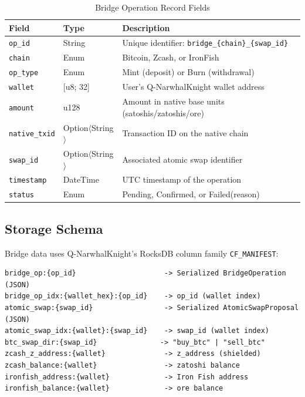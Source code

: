 \documentclass[11pt,a4paper]{article}
\begin{document}
\begin{table}[H]
\centering
\caption{Bridge Operation Record Fields}
\begin{tabularx}{\textwidth}{l l X}
\toprule
\textbf{Field} & \textbf{Type} & \textbf{Description} \\
\midrule
\texttt{op\_id} & String & Unique identifier: \texttt{bridge\_\{chain\}\_\{swap\_id\}} \\
\texttt{chain} & Enum & Bitcoin, Zcash, or IronFish \\
\texttt{op\_type} & Enum & Mint (deposit) or Burn (withdrawal) \\
\texttt{wallet} & {[}u8; 32{]} & User's Q-NarwhalKnight wallet address \\
\texttt{amount} & u128 & Amount in native base units (satoshis/zatoshis/ore) \\
\texttt{native\_txid} & Option$\langle$String$\rangle$ & Transaction ID on the native chain \\
\texttt{swap\_id} & Option$\langle$String$\rangle$ & Associated atomic swap identifier \\
\texttt{timestamp} & DateTime & UTC timestamp of the operation \\
\texttt{status} & Enum & Pending, Confirmed, or Failed(reason) \\
\bottomrule
\end{tabularx}
\end{table}

\subsection{Storage Schema}

Bridge data uses Q-NarwhalKnight's RocksDB column family \texttt{CF\_MANIFEST}:

\begin{lstlisting}[language={},title={Storage Key Format}]
bridge_op:{op_id}                     -> Serialized BridgeOperation (JSON)
bridge_op_idx:{wallet_hex}:{op_id}    -> op_id (wallet index)
atomic_swap:{swap_id}                 -> Serialized AtomicSwapProposal (JSON)
atomic_swap_idx:{wallet}:{swap_id}    -> swap_id (wallet index)
btc_swap_dir:{swap_id}               -> "buy_btc" | "sell_btc"
zcash_z_address:{wallet}              -> z_address (shielded)
zcash_balance:{wallet}                -> zatoshi balance
ironfish_address:{wallet}             -> Iron Fish address
ironfish_balance:{wallet}             -> ore balance
\end{lstlisting}
\end{document}
